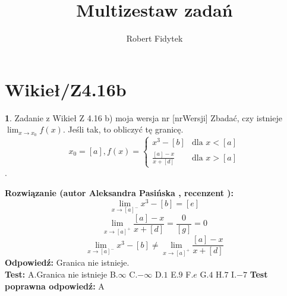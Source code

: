 \documentclass[12pt, a4paper]{article}
\title{Multizestaw zadań}
\author{Robert Fidytek}
\date{}
\theoremstyle{definition} %
\newtheorem{zad}{}
\newcommand{\kategoria}[1]{\section{#1}} %
\newcommand{\zadStart}[1]{\begin{zad}#1\newline} %
\newcommand{\zadStop}{\end{zad}}   %
\newcommand{\rozwStart}[2]{\noindent \textbf{Rozwiązanie (autor #1 , recenzent #2): }\newline} %
\newcommand{\rozwStop}{\newline}                                            %
\newcommand{\odpStart}{\noindent \textbf{Odpowiedź:}\newline}    %
\newcommand{\odpStop}{\newline}                                             %
\newcommand{\testStart}{\noindent \textbf{Test:}\newline} %
\newcommand{\testStop}{\newline} %
\newcommand{\kluczStart}{\noindent \textbf{Test poprawna odpowiedź:}\newline} %
\newcommand{\kluczStop}{\newline} %
\begin{document}
\maketitle


\kategoria{Wikieł/Z4.16b}
\zadStart{Zadanie z Wikieł Z 4.16 b) moja wersja nr [nrWersji]}
Zbadać, czy istnieje $\lim_{x\rightarrow x_{0}}f(x)$. Jeśli tak, to obliczyć tę granicę. $$x_{0}=[a],f(x)= \left\{ \begin{array}{ll}
x^3-[b] & \textrm{dla $x<[a]$}\\
\frac{[a]-x}{x+[d]} & \textrm{dla $x>[a]$}
\end{array} \right.$$.
\zadStop
\rozwStart{Aleksandra Pasińska}{}
$$\lim_{x\rightarrow [a]^-}x^3-[b]=[e]$$
$$\lim_{x\rightarrow [a]^+}\frac{[a]-x}{x+[d]}=\frac{0}{[g]}=0$$
$$\lim_{x\rightarrow [a]^-}x^3-[b] \neq \lim_{x\rightarrow [a]^+}\frac{[a]-x}{x+[d]}$$
\rozwStop
\odpStart
Granica nie istnieje.\\
\odpStop
\testStart
A.Granica nie istnieje
B.$\infty$
C.$-\infty$
D.$1$
E.$9$
F.$e$
G.$4$
H.$7$
I.$-7$
\testStop
\kluczStart
A
\kluczStop
\end{document}
